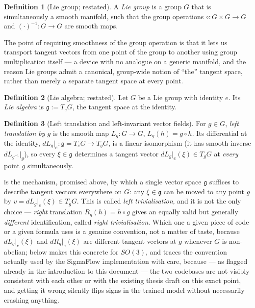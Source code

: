 \documentclass[11pt,a4paper]{report}
\theoremstyle{definition}
\newtheorem{definition}[definition]{Definition}
\theoremstyle{remark}
\begin{document}
\begin{definition}[Lie group; restated]
\label{def:liegroup-scratch}
A \emph{Lie group} is a group $G$ that is simultaneously a smooth manifold,
such that the group operations $\circ:G\times G\to G$ and
$(\cdot)^{-1}:G\to G$ are smooth maps.
\end{definition}

The point of requiring smoothness of the group operation is that it lets us
transport tangent vectors from one point of the group to another using group
multiplication itself --- a device with no analogue on a generic manifold,
and the reason Lie groups admit a canonical, group-wide notion of ``the''
tangent space, rather than merely a separate tangent space at every point.

\begin{definition}[Lie algebra; restated]
\label{def:liealgebra-scratch}
Let $G$ be a Lie group with identity $e$. Its \emph{Lie algebra} is
$\mathfrak g := T_eG$, the tangent space at the identity.
\end{definition}

\begin{definition}[Left translation and left-invariant vector fields]
\label{def:left-translation}
For $g\in G$, \emph{left translation by $g$} is the smooth map
$L_g:G\to G$, $L_g(h)=g\circ h$. Its differential at the identity,
$dL_g|_e:\mathfrak g=T_eG\to T_gG$, is a linear isomorphism (it has smooth
inverse $dL_{g^{-1}}|_g$), so every $\xi\in\mathfrak g$ determines a tangent
vector $dL_g|_e(\xi)\in T_gG$ at \emph{every} point $g$ simultaneously.
\end{definition}

 is the mechanism, promised above, by which a
single vector space $\mathfrak g$ suffices to describe tangent vectors
everywhere on $G$: any $\xi\in\mathfrak g$ can be moved to any point $g$ by
$v = dL_g|_e(\xi) \in T_gG$. This is called \emph{left trivialisation}, and
it is not the only choice --- \emph{right} translation
$R_g(h)=h\circ g$ gives an equally valid but generally \emph{different}
identification, called \emph{right trivialisation}. Which one a given piece
of code or a given formula uses is a genuine convention, not a matter of
taste, because $dL_g|_e(\xi)$ and $dR_g|_e(\xi)$ are different tangent
vectors at $g$ whenever $G$ is non-abelian; 
below makes this concrete for $SO(3)$, and  traces the
convention actually used by the SigmaFlow implementation with care, because
--- as flagged already in the introduction to this document --- the two
codebases are not visibly consistent with each other or with the existing
thesis draft on this exact point, and getting it wrong silently flips signs
in the trained model without necessarily crashing anything.
\end{document}
